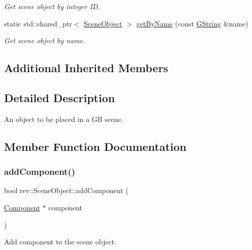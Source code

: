 \begin{DoxyCompactItemize}
\begin{DoxyCompactList}\small\item\em Get scene object by integer ID. \end{DoxyCompactList}\item 
\mbox{\label{classrev_1_1_scene_object_a2828990e53502a31bd098d8443fc6500}} 
static std\+::shared\+\_\+ptr$<$ \mbox{\hyperlink{classrev_1_1_scene_object}{Scene\+Object}} $>$ \mbox{\hyperlink{classrev_1_1_scene_object_a2828990e53502a31bd098d8443fc6500}{get\+By\+Name}} (const \mbox{\hyperlink{classrev_1_1_g_string}{G\+String}} \&name)
\begin{DoxyCompactList}\small\item\em Get scene object by name. \end{DoxyCompactList}\end{DoxyCompactItemize}
\subsection*{Additional Inherited Members}


\subsection{Detailed Description}
An object to be placed in a GB scene. 

\subsection{Member Function Documentation}
\mbox{\label{classrev_1_1_scene_object_a13d00e54d798f6fc9839d4bf5150ba4b}} 
\subsubsection{\texorpdfstring{addComponent()}{addComponent()}}
{\footnotesize\ttfamily bool rev\+::\+Scene\+Object\+::add\+Component (\begin{DoxyParamCaption}\item[{\mbox{\hyperlink{classrev_1_1_component}{Component}} $\ast$}]{component }\end{DoxyParamCaption})}



Add component to the scene object. 


